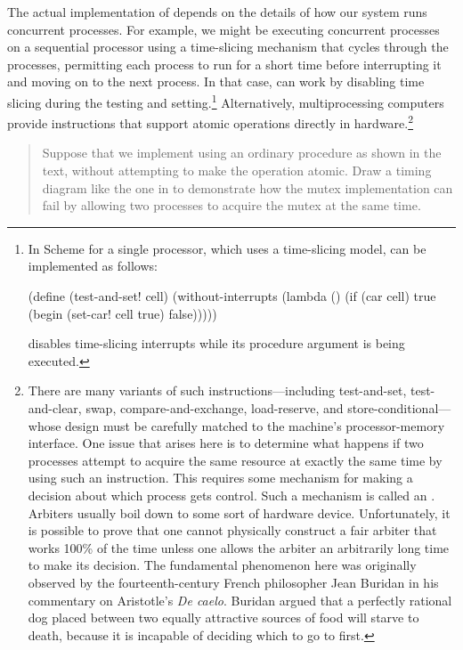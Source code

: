 The actual implementation of  depends on the details of how
our system runs concurrent processes.  For example, we might be executing
concurrent processes on a sequential processor using a time-slicing mechanism
that cycles through the processes, permitting each process to run for a short
time before interrupting it and moving on to the next process.  In that case,
  can work by disabling time slicing during the testing and
setting.\footnote{In  Scheme for a single processor, which uses a
time-slicing model,  can be implemented as follows:

\begin{smallscheme}
(define (test-and-set! cell)
  (without-interrupts
   (lambda ()
     (if (car cell)
         true
         (begin (set-car! cell true)
                false)))))
\end{smallscheme}

\noindent
{} disables time-slicing interrupts while its procedure
argument is being executed.}  Alternatively, multiprocessing computers provide
instructions that support atomic operations directly in
hardware.\footnote{There are many variants of such instructions---including
test-and-set, test-and-clear, swap, compare-and-exchange, load-reserve, and
store-conditional---whose design must be carefully matched to the machine's
processor-memory interface.  One issue that arises here is to determine what
happens if two processes attempt to acquire the same resource at exactly the
same time by using such an instruction.  This requires some mechanism for
making a decision about which process gets control.  Such a mechanism is called
an .  Arbiters usually boil down to some sort of hardware
device.  Unfortunately, it is possible to prove that one cannot physically
construct a fair arbiter that works 100\% of the time unless one allows the
arbiter an arbitrarily long time to make its decision.  The fundamental
phenomenon here was originally observed by the fourteenth-century French
philosopher Jean Buridan in his commentary on Aristotle's \textit{De caelo}.
Buridan argued that a perfectly rational dog placed between two equally
attractive sources of food will starve to death, because it is incapable of
deciding which to go to first.}

\begin{quote}
 Suppose that we implement
  using an ordinary procedure as shown in the text, without
attempting to make the operation atomic.  Draw a timing diagram like the one in
 to demonstrate how the mutex implementation can fail by
allowing two processes to acquire the mutex at the same time.
\end{quote}

